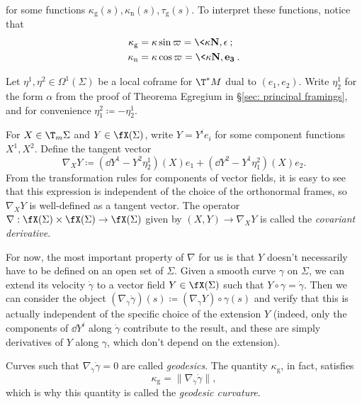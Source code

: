 for some functions $\kappa_{\mathrm{g}}(s),\kappa_{\mathrm{n}}(s),\tau_{\mathrm{g}}(s)$. To interpret these functions, notice that 
\begin{align}
    \kappa_{\mathrm{g}}&=\kappa\sin\varpi=\<\kappa \bf{N},\bf{\epsilon}\>;\\
    \kappa_{\mathrm{n}}&=\kappa\cos\varpi=\<\kappa \bf{N},e_3\>.\\
\end{align}

\begin{rem}\label{rem covariant derivative on surfaces}
    Let $\eta^1,\eta^2\in\Omega^1(\Sigma)$ be a local coframe for $\T^\ast M$ dual to $(e_1,e_2)$. Write $\eta^1_2$ for the form $\alpha$ from the proof of Theorema Egregium in \S\ref{sec: principal framings}, and for convenience $\eta^2_1\coloneqq -\eta^1_2$.

    For $X\in \T_m \Sigma$ and $Y\in\fX(\Sigma)$, write $Y=Y^ie_i$ for some component functions $X^1,X^2$. Define the tangent vector 
    \[\nabla_X Y\coloneqq (\dd Y^1-Y^2\eta^1_2)(X)e_1+(\dd Y^2-Y^1\eta^2_1)(X)e_2.\]
    From the transformation rules for components of vector fields, it is easy to see that this expression is independent of the choice of the orthonormal frames, so $\nabla_X Y$ is well-defined as a tangent vector. The operator $\nabla:\fX(\Sigma)\times \fX(\Sigma)\to \fX(\Sigma)$ given by $(X,Y)\to \nabla_X Y$ is called the \emph{covariant derivative}.

    For now, the most important property of $\nabla$ for us is that $Y$ doesn't necessarily have to be defined on an open set of $\Sigma$. Given a smooth curve $\gamma$ on $\Sigma$, we can extend its velocity $\dot \gamma$ to a vector field $Y\in\fX(\Sigma)$ such that $Y\circ\gamma=\dot\gamma$. Then we can consider the object $(\nabla_{\dot\gamma}\dot\gamma)(s)\coloneqq (\nabla_{\dot\gamma}Y)\circ\gamma(s)$ and verify that this is actually independent of the specific choice of the extension $Y$ (indeed, only the components of $\dd Y^i$ along $\dot\gamma$ contribute to the result, and these are simply derivatives of $Y$ along $\gamma$, which don't depend on the extension). 
    
    Curves such that $\nabla_{\dot\gamma}\dot\gamma=0$ are called \emph{geodesics}. The quantity $\kappa_{\mathrm{g}}$, in fact, satisfies 
    \[\kappa_{\mathrm{g}}=\lVert\nabla_{\dot\gamma}\dot\gamma\rVert,\]
    which is why this quantity is called the \emph{geodesic curvature}. 
\end{rem}

